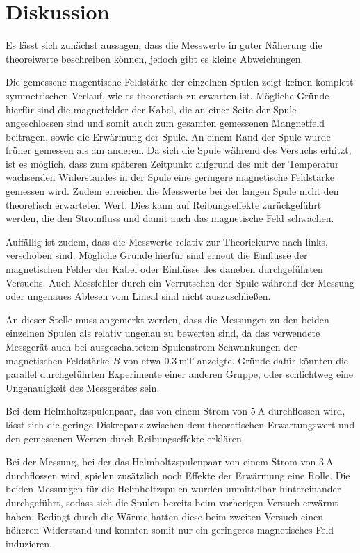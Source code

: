 \section{Diskussion}
\label{sec:Diskussion}
Es lässt sich zunächst aussagen, dass die Messwerte in guter Näherung die theoreiwerte
beschreiben können, jedoch gibt es kleine Abweichungen.

Die gemessene magentische Feldstärke der einzelnen Spulen zeigt keinen komplett
symmetrischen Verlauf, wie es theoretisch zu erwarten ist. Mögliche Gründe hierfür sind
die magnetfelder der Kabel, die an einer Seite der Spule angeschlossen sind und somit
auch zum gesamten gemessenen Mangnetfeld beitragen, sowie die Erwärmung der Spule.
An einem Rand der Spule wurde früher gemessen als am anderen. Da sich die Spule
während des Versuchs erhitzt, ist es möglich, dass zum späteren Zeitpunkt aufgrund des
mit der Temperatur wachsenden Widerstandes in der Spule eine geringere magnetische
Feldstärke gemessen wird. Zudem erreichen die Messwerte bei der langen Spule nicht
den theoretisch erwarteten Wert. Dies kann auf Reibungseffekte zurückgeführt werden,
die den Stromfluss und damit auch das magnetische Feld schwächen.

Auffällig ist zudem, dass die Messwerte relativ zur Theoriekurve nach links, verschoben sind.
Mögliche Gründe hierfür sind erneut die Einflüsse der magnetischen Felder der Kabel oder
Einflüsse des daneben durchgeführten Versuchs. Auch Messfehler durch ein Verrutschen
der Spule während der Messung oder ungenaues Ablesen vom Lineal sind nicht auszuschließen.

An dieser Stelle muss angemerkt werden, dass die Messungen zu den beiden einzelnen Spulen
als relativ ungenau zu bewerten sind, da das verwendete Messgerät auch bei ausgeschaltetem
Spulenstrom Schwankungen der magnetischen Feldstärke $B$ von etwa $\SI{0,3}{\milli\tesla}$ anzeigte.
Gründe dafür könnten die parallel durchgeführten Experimente einer anderen Gruppe,
oder schlichtweg eine Ungenauigkeit des Messgerätes sein.

Bei dem Helmholtzspulenpaar, das von einem
Strom von $\SI{5}{\ampere}$ durchflossen wird, lässt sich die geringe Diskrepanz zwischen dem
theoretischen Erwartungswert und den gemessenen Werten durch Reibungseffekte erklären.

Bei der Messung, bei der das Helmholtzspulenpaar von einem Strom von $\SI{3}{\ampere}$ durchflossen
wird, spielen zusätzlich noch Effekte der Erwärmung eine Rolle. Die beiden Messungen
für die Helmholtzspulen wurden unmittelbar hintereinander durchgeführt, sodass sich die
Spulen bereits beim vorherigen Versuch erwärmt haben. Bedingt durch die Wärme
hatten diese beim zweiten Versuch einen höheren Widerstand und konnten somit nur ein
geringeres magnetisches Feld induzieren.

